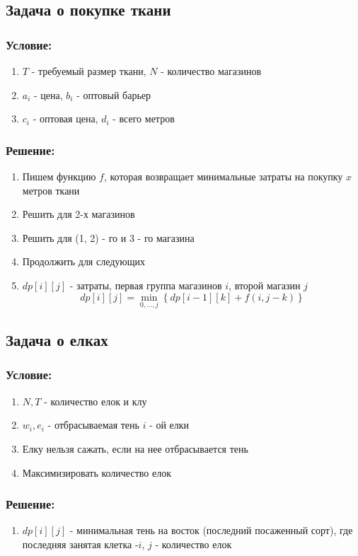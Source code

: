 \subsection{Задача о покупке ткани}

\subsubsection{Условие:}

\begin{enumerate}
    \item $T$ - требуемый размер ткани, $N$ - количество магазинов
    \item $a_i$ - цена, $b_i$ - оптовый барьер
    \item $c_i$ - оптовая цена, $d_i$ - всего метров
\end{enumerate}

\subsubsection{Решение:}

\begin{enumerate}
    \item Пишем функцию $f$, которая возвращает минимальные затраты на покупку $x$ метров ткани
    \item Решить для 2-х магазинов
    \item Решить для (1, 2) - го и 3 - го магазина
    \item Продолжить для следующих
    \item $dp[i][j]$ - затраты, первая группа магазинов $i$, второй магазин $j$
    $$dp[i][j] = \min_{0, \dots, j}\left\{dp[i - 1][k] + f(i, j - k)\right\}$$ 
\end{enumerate}


\subsection{Задача о елках}

\subsubsection{Условие:}

\begin{enumerate}
    \item $N, T$ - количество елок и клу
    \item $w_i, e_i$ - отбрасываемая тень $i$ - ой елки
    \item Елку нельзя сажать, если на нее отбрасывается тень
    \item Максимизировать количество елок
\end{enumerate}

\subsubsection{Решение:}

\begin{enumerate}
    \item $dp[i][j]$ - минимальная тень на восток (последний посаженный сорт), где последняя занятая клетка -$i$, $j$ - количество елок\end{enumerate}
